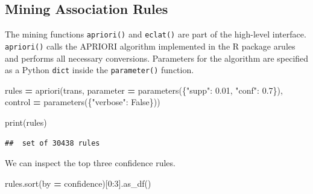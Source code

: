 \documentclass{article}
\newenvironment{Shaded}{\begin{snugshade}}{\end{snugshade}}
\newcommand{\BuiltInTok}[1]{#1}
\newcommand{\DecValTok}[1]{\textcolor[rgb]{0.00,0.00,0.81}{#1}}
\newcommand{\FloatTok}[1]{\textcolor[rgb]{0.00,0.00,0.81}{#1}}
\newcommand{\NormalTok}[1]{#1}
\newcommand{\OperatorTok}[1]{\textcolor[rgb]{0.81,0.36,0.00}{\textbf{#1}}}
\newcommand{\StringTok}[1]{\textcolor[rgb]{0.31,0.60,0.02}{#1}}
\newcommand{\VariableTok}[1]{\textcolor[rgb]{0.00,0.00,0.00}{#1}}
\begin{document}
\hypertarget{mining-association-rules}{%
\subsection{Mining Association Rules}\label{mining-association-rules}}

The mining functions \texttt{apriori()} and \texttt{eclat()} are part of
the high-level interface. \texttt{apriori()} calls the APRIORI algorithm
implemented in the R package arules and performs all necessary
conversions. Parameters for the algorithm are specified as a Python
\texttt{dict} inside the \texttt{parameter()} function.

\begin{Shaded}
\begin{Highlighting}[]
\NormalTok{rules }\OperatorTok{=}\NormalTok{ apriori(trans,}
\NormalTok{                    parameter }\OperatorTok{=}\NormalTok{ parameters(\{}\StringTok{"supp"}\NormalTok{: }\FloatTok{0.01}\NormalTok{, }\StringTok{"conf"}\NormalTok{: }\FloatTok{0.7}\NormalTok{\}), }
\NormalTok{                    control }\OperatorTok{=}\NormalTok{ parameters(\{}\StringTok{"verbose"}\NormalTok{: }\VariableTok{False}\NormalTok{\}))  }

\BuiltInTok{print}\NormalTok{(rules)}
\end{Highlighting}
\end{Shaded}

\begin{verbatim}
##  set of 30438 rules
\end{verbatim}

We can inspect the top three confidence rules.

\begin{Shaded}
\begin{Highlighting}[]
\NormalTok{rules.sort(by }\OperatorTok{=} \StringTok{\textquotesingle{}confidence\textquotesingle{}}\NormalTok{)[}\DecValTok{0}\NormalTok{:}\DecValTok{3}\NormalTok{].as\_df()}
\end{Highlighting}
\end{Shaded}
\end{document}
